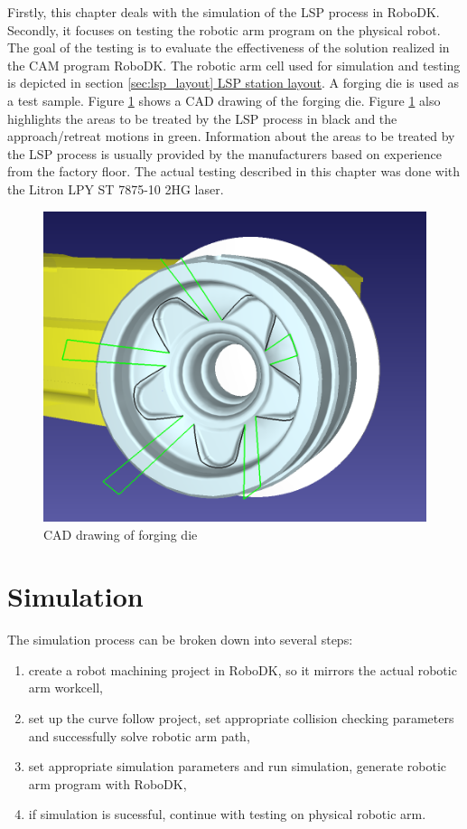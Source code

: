 \label{chap:testing}

Firstly, this chapter deals with the simulation of the LSP process in RoboDK. Secondly, it focuses on testing the robotic arm program on the physical robot. The goal of the testing is to evaluate the effectiveness of the solution realized in the CAM program RoboDK. The robotic arm cell used for simulation and testing is depicted in section \hyperref[sec:lsp_layout]{\ref{sec:lsp_layout} LSP station layout}. A forging die is used as a test sample. Figure \ref{fig:cad} shows a CAD drawing of the forging die. Figure \ref{fig:cad} also highlights the areas to be treated by the LSP process in black and the approach/retreat motions in green. Information about the areas to be treated by the LSP process is usually provided by the manufacturers based on experience from the factory floor. The actual testing described in this chapter was done with the Litron LPY ST 7875-10 2HG laser. 

\begin{figure}[h]
    \centering
    \includegraphics[width=0.8\linewidth]{img/cad.PNG}
    \caption{CAD drawing of forging die}
    \label{fig:cad}
\end{figure}

\section{Simulation}

The simulation process can be broken down into several steps:

\begin{enumerate}

\item create a robot machining project in RoboDK, so it mirrors the actual robotic arm workcell, 

\item set up the curve follow project, set appropriate collision checking parameters and successfully solve robotic arm path,

\item set appropriate simulation parameters and run simulation,
generate robotic arm program with RoboDK,

\item if simulation is sucessful, continue with testing on physical robotic arm.

\end{enumerate}

